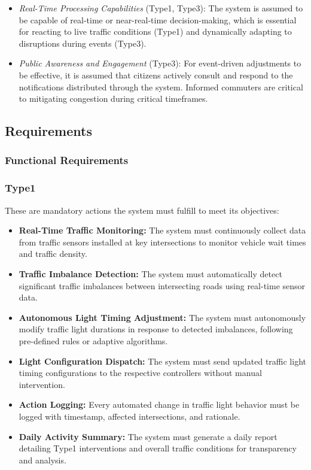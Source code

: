 \documentclass[a4paper,12pt]{article}
\begin{document}
\begin{itemize}
    \item \textit{Real-Time Processing Capabilities} (Type1, Type3): The system is assumed to be capable of real-time or near-real-time decision-making, which is essential for reacting to live traffic conditions (Type1) and dynamically adapting to disruptions during events (Type3).

    \item \textit{Public Awareness and Engagement} (Type3): For event-driven adjustments to be effective, it is assumed that citizens actively consult and respond to the notifications distributed through the system. Informed commuters are critical to mitigating congestion during critical timeframes.
    
\end{itemize}

\newpage

\subsection{Requirements}

\subsubsection{Functional Requirements}

\subsubsection*{Type1}
These are mandatory actions the system must fulfill to meet its objectives:
\begin{itemize}
    \item \textbf{Real-Time Traffic Monitoring:}  
    The system must continuously collect data from traffic sensors installed at key intersections to monitor vehicle wait times and traffic density.

    \item \textbf{Traffic Imbalance Detection:}  
    The system must automatically detect significant traffic imbalances between intersecting roads using real-time sensor data.

    \item \textbf{Autonomous Light Timing Adjustment:}  
    The system must autonomously modify traffic light durations in response to detected imbalances, following pre-defined rules or adaptive algorithms.

    \item \textbf{Light Configuration Dispatch:}  
    The system must send updated traffic light timing configurations to the respective controllers without manual intervention.

    \item \textbf{Action Logging:}  
    Every automated change in traffic light behavior must be logged with timestamp, affected intersections, and rationale.

    \item \textbf{Daily Activity Summary:}  
    The system must generate a daily report detailing Type1 interventions and overall traffic conditions for transparency and analysis.
\end{itemize}
\end{document}
